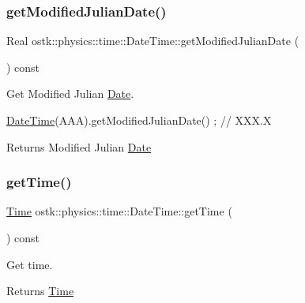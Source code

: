 \subsubsection{\texorpdfstring{get\+Modified\+Julian\+Date()}{getModifiedJulianDate()}}
{\footnotesize\ttfamily Real ostk\+::physics\+::time\+::\+Date\+Time\+::get\+Modified\+Julian\+Date (\begin{DoxyParamCaption}{ }\end{DoxyParamCaption}) const}



Get Modified Julian \hyperlink{classostk_1_1physics_1_1time_1_1_date}{Date}. 


\begin{DoxyCode}
\hyperlink{classostk_1_1physics_1_1time_1_1_date_time_a974b5a7581ae7461ccf0e6ab85e42633}{DateTime}(AAA).getModifiedJulianDate() ; \textcolor{comment}{// XXX.X}
\end{DoxyCode}


\begin{DoxyReturn}{Returns}
Modified Julian \hyperlink{classostk_1_1physics_1_1time_1_1_date}{Date} 
\end{DoxyReturn}
\mbox{\label{classostk_1_1physics_1_1time_1_1_date_time_ae1460f38a9e41c5c7e42874de571d9f9}} 
\subsubsection{\texorpdfstring{get\+Time()}{getTime()}}
{\footnotesize\ttfamily \hyperlink{classostk_1_1physics_1_1time_1_1_time}{Time} ostk\+::physics\+::time\+::\+Date\+Time\+::get\+Time (\begin{DoxyParamCaption}{ }\end{DoxyParamCaption}) const}



Get time. 

\begin{DoxyReturn}{Returns}
\hyperlink{classostk_1_1physics_1_1time_1_1_time}{Time} 
\end{DoxyReturn}
\mbox{\label{classostk_1_1physics_1_1time_1_1_date_time_a034452967c2b5a89368d33a61dec2606}} 
